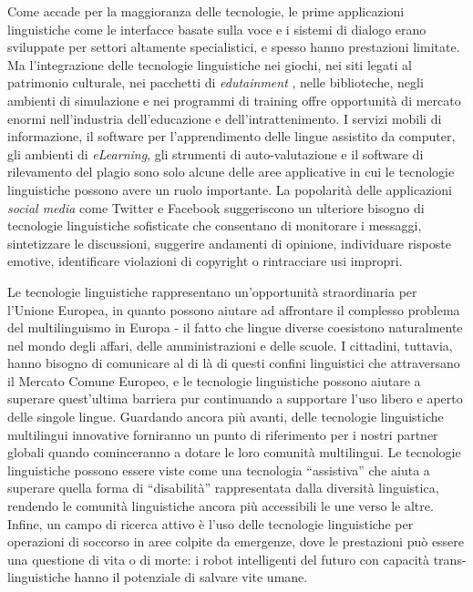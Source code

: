 \documentclass[]{../../metanetpaper}
\begin{document}
\begin{multicols}{2}
Come accade per la maggioranza delle tecnologie, le prime applicazioni
linguistiche come le interfacce basate sulla voce e i sistemi di dialogo erano
sviluppate per settori altamente specialistici, e spesso hanno prestazioni
limitate. Ma l'integrazione delle tecnologie linguistiche nei giochi, nei siti
legati al patrimonio culturale, nei pacchetti di \emph{ edutainment }, nelle
biblioteche, negli ambienti di simulazione e nei programmi di training offre
opportunit\`{a} di mercato enormi nell'industria dell'educazione e
dell'intrattenimento.  I servizi mobili di informazione, il software per
l'apprendimento delle lingue assistito da computer, gli ambienti di
\emph{eLearning}, gli strumenti di auto-valutazione e il software di
rilevamento del plagio sono solo alcune delle aree applicative in cui le
tecnologie linguistiche possono avere un ruolo importante. La popolarit\`{a}
delle applicazioni \emph{social media} come Twitter e Facebook suggeriscono un
ulteriore bisogno di tecnologie linguistiche sofisticate che consentano di
monitorare i messaggi, sintetizzare le discussioni, suggerire andamenti di
opinione, individuare risposte emotive, identificare violazioni di copyright o
rintracciare usi impropri.






Le tecnologie linguistiche rappresentano un'opportunit\`{a} straordinaria per
l'Unione Europea, in quanto possono aiutare ad affrontare il complesso
problema del multilinguismo in Europa - il fatto che lingue diverse coesistono
naturalmente nel mondo degli affari, delle amministrazioni e delle scuole. I
cittadini, tuttavia, hanno bisogno di comunicare al di l\`{a} di questi
confini linguistici che attraversano il Mercato Comune Europeo, e le
tecnologie linguistiche possono aiutare a superare quest'ultima barriera pur
continuando a supportare l'uso libero e aperto delle singole lingue. Guardando
ancora pi\`{u} avanti, delle tecnologie linguistiche multilingui innovative
forniranno un punto di riferimento per i nostri partner globali quando
cominceranno a dotare le loro comunit\`{a} multilingui. Le tecnologie
linguistiche possono essere viste come una tecnologia “assistiva” che aiuta a
superare quella forma di “disabilit\`{a}” rappresentata dalla diversit\`{a}
linguistica, rendendo le comunit\`{a} linguistiche ancora pi\`{u} accessibili
le une verso le altre. Infine, un campo di ricerca attivo \`{e} l'uso delle
tecnologie linguistiche per operazioni di soccorso in aree colpite da
emergenze, dove le prestazioni pu\`{o} essere una questione di vita o di
morte: i robot intelligenti del futuro con capacit\`{a} trans-linguistiche
hanno il potenziale di salvare vite umane.




\end{multicols}
\end{document}
